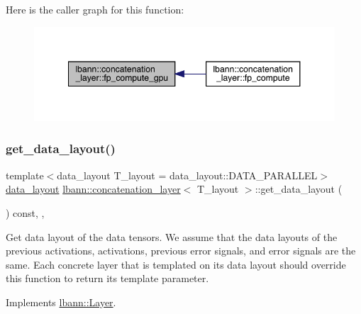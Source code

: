 Here is the caller graph for this function\+:\nopagebreak
\begin{figure}[H]
\begin{center}
\leavevmode
\includegraphics[width=348pt]{classlbann_1_1concatenation__layer_afd6cb5cf50acf95c2e3ba2e365be3525_icgraph}
\end{center}
\end{figure}
\mbox{\label{classlbann_1_1concatenation__layer_afa17d94708fe6d35db2925f664104d42}} 
\subsubsection{\texorpdfstring{get\+\_\+data\+\_\+layout()}{get\_data\_layout()}}
{\footnotesize\ttfamily template$<$data\+\_\+layout T\+\_\+layout = data\+\_\+layout\+::\+D\+A\+T\+A\+\_\+\+P\+A\+R\+A\+L\+L\+EL$>$ \\
\hyperlink{base_8hpp_a786677cbfb3f5677b4d84f3056eb08db}{data\+\_\+layout} \hyperlink{classlbann_1_1concatenation__layer}{lbann\+::concatenation\+\_\+layer}$<$ T\+\_\+layout $>$\+::get\+\_\+data\+\_\+layout (\begin{DoxyParamCaption}{ }\end{DoxyParamCaption}) const\hspace{0.3cm}{\ttfamily [inline]}, {\ttfamily [override]}, {\ttfamily [virtual]}}

Get data layout of the data tensors. We assume that the data layouts of the previous activations, activations, previous error signals, and error signals are the same. Each concrete layer that is templated on its data layout should override this function to return its template parameter. 

Implements \hyperlink{classlbann_1_1Layer_a5dfb66e81fc085997402a5e2241316bd}{lbann\+::\+Layer}.



